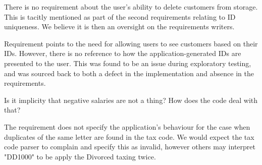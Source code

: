 There is no requirement about the user's ability to delete customers from storage. This is tacitly mentioned as part of the second requirements relating to ID uniqueness. We believe it is then an oversight on the requirements writers. 
\par
Requirement \RFour \space points to the need for allowing users to see customers based on their IDs. However, there is no reference to how the application-generated IDs are presented to the user. This was found to be an issue during exploratory testing, and was sourced back to both a defect in the implementation and absence in the requirements. 
\par
Is it implicity that negative salaries are not a thing? How does the code deal with that? 
\par
The requirement does not specify the application's behaviour for the case when duplicates of the same letter are found in the tax code. We would expect the tax code parser to complain and specify this as invalid, however others may interpret "DD1000" to be apply the Divorced taxing twice. 




